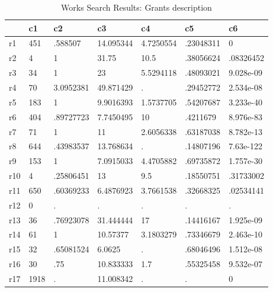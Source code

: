 \begin{table}[htbp]
\caption{\label{taba5} Works Search Results: Grants description}\centering\medskip
\begin{tabular}{|l|l|l|l|l|l|l|}\hline  
 & c1  & c2  & c3  & c4  & c5  & c6  \\ \hline  
r1 & 451 & .588507 & 14.095344 & 4.7250554 & .23048311 & 0 \\ \hline 
r2 & 4 & 1 & 31.75 & 10.5 & .38056624 & .08326452 \\ \hline 
r3 & 34 & 1 & 23 & 5.5294118 & .48093021 & 9.028e-09 \\ \hline 
r4 & 70 & 3.0952381 & 49.871429 & . & .29452772 & 2.534e-08 \\ \hline 
r5 & 183 & 1 & 9.9016393 & 1.5737705 & .54207687 & 3.233e-40 \\ \hline 
r6 & 404 & .89727723 & 7.7450495 & 10 & .4211679 & 8.976e-83 \\ \hline 
r7 & 71 & 1 & 11 & 2.6056338 & .63187038 & 8.782e-13 \\ \hline 
r8 & 644 & .43983537 & 13.768634 & . & .14807196 & 7.63e-122 \\ \hline 
r9 & 153 & 1 & 7.0915033 & 4.4705882 & .69735872 & 1.757e-30 \\ \hline 
r10 & 4 & .25806451 & 13 & 9.5 & .18550751 & .31733002 \\ \hline 
r11 & 650 & .60369233 & 6.4876923 & 3.7661538 & .32668325 & .02534141 \\ \hline 
r12 & 0 & . & . & . & . & . \\ \hline 
r13 & 36 & .76923078 & 31.444444 & 17 & .14416167 & 1.925e-09 \\ \hline 
r14 & 61 & 1 & 10.57377 & 3.1803279 & .73346679 & 2.463e-10 \\ \hline 
r15 & 32 & .65081524 & 6.0625 & . & .68046496 & 1.512e-08 \\ \hline 
r16 & 30 & .75 & 10.833333 & 1.7 & .55325458 & 9.532e-07 \\ \hline 
r17 & 1918 & . & 11.008342 & . & . & 0 \\ \hline 
  \end{tabular}
\end{table}
